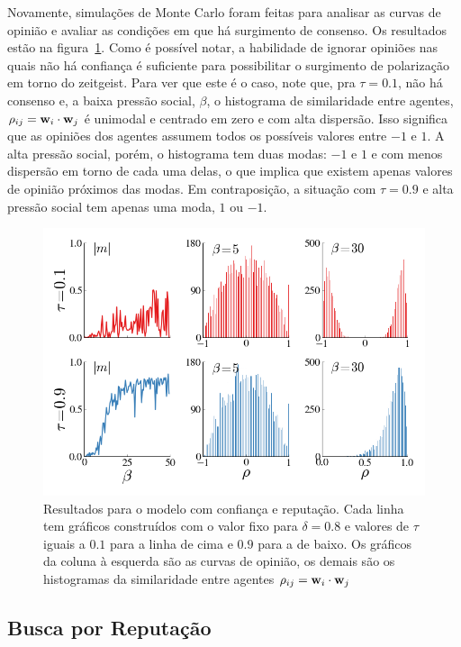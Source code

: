 \documentclass[11pt]{article}
\begin{document}
Novamente, simulações de Monte Carlo foram feitas para analisar as curvas de
opinião e avaliar as condições em que há surgimento de consenso.
Os resultados estão na figura~\ref{data1}.
Como é possível notar, a habilidade de ignorar opiniões nas quais não há
confiança é suficiente para possibilitar o surgimento de polarização em torno do
zeitgeist. Para ver que este é o caso, note que, pra $\tau=0.1$, não há consenso
e, a baixa pressão social, $\beta$, o histograma de similaridade entre agentes,
$\rho_{ij} = \displaystyle { \ensuremath{\displaystyle \bold{w}_{i} } } \cdot { \ensuremath{\displaystyle \bold{w}_{j} } } $ é unimodal e centrado em zero e com alta
dispersão.
Isso significa que as opiniões dos agentes assumem todos os possíveis valores
entre $-1$ e $1$.
A alta pressão social, porém, o histograma tem duas modas: $-1$ e $1$ e com
menos dispersão em torno de cada uma delas, o que implica que existem apenas
valores de opinião próximos das modas.
Em contraposição, a situação com $\tau=0.9$ e alta pressão social tem apenas uma
moda, $1$ ou $-1$.

\begin{figure}[h!]
  \centering
      \includegraphics[width=1.0\textwidth]{data1.png}
  \caption{Resultados para o modelo com confiança e reputação.
  Cada linha tem gráficos construídos com o valor fixo para $\delta=0.8$ e
  valores de $\tau$ iguais a $0.1$ para a linha de cima e $0.9$ para a de baixo.
  Os gráficos da coluna à esquerda são as curvas de opinião, os demais são os
  histogramas da similaridade entre agentes $\rho_{ij} = \displaystyle { \ensuremath{\displaystyle \bold{w}_{i} } } \cdot { \ensuremath{\displaystyle \bold{w}_{j} } } $}
  \label{data1}
\end{figure}


\subsection{Busca por Reputação}
\end{document}
